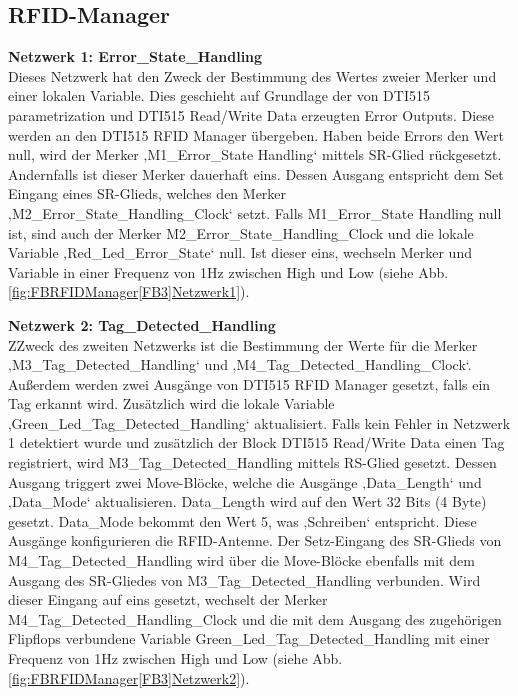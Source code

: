 \subsection*{RFID-Manager}
\label{subsec:RFID-Manager}
\textbf{Netzwerk 1: Error\_State\_Handling}\\
Dieses Netzwerk hat den Zweck der Bestimmung des Wertes zweier Merker und einer lokalen Variable. Dies geschieht auf Grundlage der von DTI515 parametrization und DTI515 Read/Write Data erzeugten Error Outputs. Diese werden an den DTI515 RFID Manager übergeben. Haben beide Errors den Wert null, wird der Merker ‚M1\_Error\_State Handling‘ mittels SR-Glied rückgesetzt. Andernfalls ist dieser Merker dauerhaft eins. Dessen Ausgang entspricht dem Set Eingang eines SR-Glieds, welches den Merker ‚M2\_Error\_State\_Handling\_Clock‘ setzt. Falls M1\_Error\_State Handling null ist, sind auch der Merker M2\_Error\_State\_Handling\_Clock und die lokale Variable ‚Red\_Led\_Error\_State‘ null. Ist dieser eins, wechseln Merker und Variable in einer Frequenz von 1Hz zwischen High und Low (siehe Abb. \ref{fig:FBRFIDManager[FB3]Netzwerk1}).

\textbf{Netzwerk 2: Tag\_Detected\_Handling}\\
ZZweck des zweiten Netzwerks ist die Bestimmung der Werte für die Merker ‚M3\_Tag\_Detected\_Handling‘ und ‚M4\_Tag\_Detected\_Handling\_Clock‘. Außerdem werden zwei Ausgänge von DTI515 RFID Manager gesetzt, falls ein Tag erkannt wird. Zusätzlich wird die lokale Variable ‚Green\_Led\_Tag\_Detected\_Handling‘ aktualisiert. Falls kein Fehler in Netzwerk 1 detektiert wurde und zusätzlich der Block DTI515 Read/Write Data einen Tag registriert,  wird M3\_Tag\_Detected\_Handling mittels RS-Glied gesetzt. Dessen Ausgang triggert zwei Move-Blöcke, welche die Ausgänge ‚Data\_Length‘ und ‚Data\_Mode‘ aktualisieren. Data\_Length wird auf den Wert 32 Bits (4 Byte) gesetzt. Data\_Mode bekommt den Wert 5, was ‚Schreiben‘ entspricht. Diese Ausgänge konfigurieren die RFID-Antenne. Der Setz-Eingang des SR-Glieds von M4\_Tag\_Detected\_Handling wird über die Move-Blöcke ebenfalls mit dem Ausgang des SR-Gliedes von M3\_Tag\_Detected\_Handling verbunden. Wird dieser Eingang auf eins gesetzt, wechselt der Merker M4\_Tag\_Detected\_Handling\_Clock und die mit dem Ausgang des zugehörigen Flipflops verbundene Variable Green\_Led\_Tag\_Detected\_Handling mit einer Frequenz von 1Hz zwischen High und Low (siehe Abb. \ref{fig:FBRFIDManager[FB3]Netzwerk2}).

